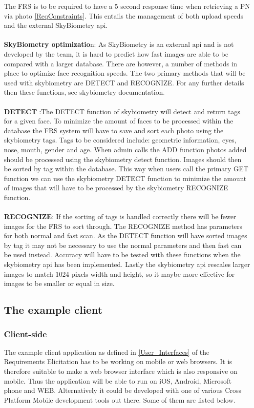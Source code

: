 \documentclass[a4paper,11pt]{article}
\begin{document}
The FRS is to be required to have a 5 second response time when retrieving a PN via photo \ref{ReqConstraints}. This entails the management of both upload speeds and the external SkyBiometry api.
\\\\
\textbf{SkyBiometry optimizatio}n: As SkyBiometry is an external api and is not developed by the team, it is hard to predict how fast images are able to be compared with a larger database. There are however, a number of methods in place to optimize face recognition speeds. The two primary methods that will be used with skybiometry are DETECT and RECOGNIZE. For any further details then these functions, see skybiometry documentation.
\\\\
\textbf{DETECT} :The DETECT function of skybiometry will detect and return tags for a given face. To minimize the amount of faces to be processed within the database the FRS system will have to save and sort each photo using the skybiometry tags. Tags to be considered include: geometric information, eyes, nose, mouth, gender and age. When admin calls the ADD function photos added should be processed using the skybiometry detect function. Images should then be sorted by tag within the database. This way when users call the primary GET function we can use the skybiometry DETECT function to minimize the amount of images that will have to be processed by the skybiometry RECOGNIZE function.
\\\\
\textbf{RECOGNIZE}: If the sorting of tags is handled correctly there will be fewer images for the FRS to sort through. The RECOGNIZE method has parameters for both normal and fast scan. As the DETECT function will have sorted images by tag it may not be necessary to use the normal parameters and then fast can be used instead. Accuracy will have to be tested with these functions when the skybiometry api has been implemented. Lastly the skybiometry api rescales larger images to match 1024 pixels width and height, so it maybe more effective for images to be smaller or equal in size. 

\subsection{The example client}
\subsubsection{Client-side}
\noindent The example client application as defined in \ref{User_Interfaces} of the Requirements Elicitation has to be working on mobile or web browsers. It is therefore suitable to make a web browser interface which is also responsive on mobile. Thus the application will be able to run on iOS, Android, Microsoft phone and WEB. Alternatively it could be developed with one of various Cross Platform Mobile development tools out there. Some of them are listed below.
\end{document}

